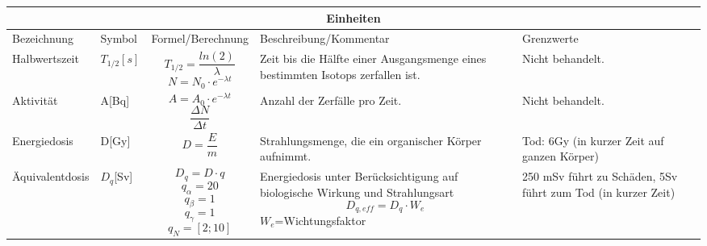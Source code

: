 \documentclass{article}
\begin{document}
        \begin{tabular}{ |p{4cm}|p{1cm}|p{3cm}|p{4cm}|p{4cm}|  }
            \hline
            \multicolumn{5}{|c|}{\textbf{Einheiten}} \\
            \hline
            Bezeichnung & Symbol & Formel/Berechnung & Beschreibung/Kommentar & Grenzwerte \\
            \hline
            Halbwertszeit   & $ T_{1/2} [s] $   & \[ T_{1/2}=\frac{ln(2)}{\lambda} \] \[N=N_0 \cdot e^{-\lambda t}\] &   Zeit bis die Hälfte einer Ausgangsmenge eines bestimmten Isotops zerfallen ist. & Nicht behandelt. \\
            \hline
            Aktivität & A[Bq] &   \[A=A_0 \cdot e^{-\lambda t}\] \[\frac{\Delta N}{\Delta t}\]  & Anzahl der Zerfälle pro Zeit.   & Nicht behandelt. \\
            \hline
            Energiedosis & D[Gy] & \[D=\frac{E}{m}\] &  Strahlungsmenge, die ein organischer Körper aufnimmt. & Tod: 6Gy (in kurzer Zeit auf ganzen Körper)\\
            \hline
            Äquivalentdosis & $D_q$[Sv]& \[ D_q = D \cdot q \] \[q_{\alpha}=20\] \[q_{\beta}=1\]\[q_{\gamma}=1\] \[q_{N}=[2;10]\] & Energiedosis unter Berücksichtigung auf biologische Wirkung und Strahlungsart \[D_{q,eff}=D_q \cdot W_e\] $W_e$=Wichtungsfaktor & 250 mSv führt zu Schäden, 5Sv führt zum Tod (in kurzer Zeit) \\
            \hline
           \end{tabular}
\end{document}
